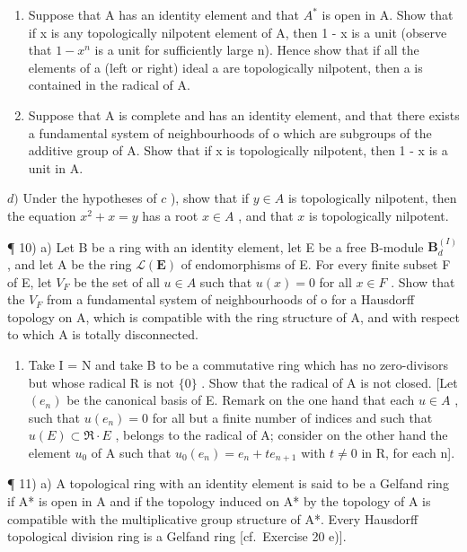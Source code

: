 \begin{enumerate}
\def\labelenumi{\alph{enumi})}
\setcounter{enumi}{1}
\item
  Suppose that A has an identity element and that \(A^{*}\) is open in A. Show that if x is any topologically nilpotent element of A, then 1 - x is a unit (observe that \(1 - x^{n}\) is a unit for sufficiently large n). Hence show that if all the elements of a (left or right) ideal a are topologically nilpotent, then a is contained in the radical of A.
\item
  Suppose that A is complete and has an identity element, and that there exists a fundamental system of neighbourhoods of o which are subgroups of the additive group of A. Show that if x is topologically nilpotent, then 1 - x is a unit in A.
\end{enumerate}

\(d)\) Under the hypotheses of \(c\) ), show that if \(y \in A\) is topologically nilpotent, then the equation \(x^{2} + x = y\) has a root \(x \in A\) , and that \(x\) is topologically nilpotent.

¶ 10) a) Let B be a ring with an identity element, let E be a free B-module \(\mathbf{B}_{d}^{(I)}\) , and let A be the ring \(\mathcal{L}(\mathbf{E})\) of endomorphisms of E. For every finite subset F of E, let \(V_{F}\) be the set of all \(u \in A\) such that \(u(x) = 0\) for all \(x \in F\) . Show that the \(V_{F}\) from a fundamental system of neighbourhoods of o for a Hausdorff topology on A, which is compatible with the ring structure of A, and with respect to which A is totally disconnected.

\begin{enumerate}
\def\labelenumi{\alph{enumi})}
\setcounter{enumi}{1}
\tightlist
\item
  Take I = N and take B to be a commutative ring which has no zero-divisors but whose radical R is not \(\{0\}\) . Show that the radical of A is not closed. {[}Let \((e_{n})\) be the canonical basis of E. Remark on the one hand that each \(u \in A\) , such that \(u(e_{n}) = 0\) for all but a finite number of indices and such that \(u(E) \subset \Re \cdot E\) , belongs to the radical of A; consider on the other hand the element \(u_{0}\) of A such that \(u_{0}(e_{n}) = e_{n} + te_{n+1}\) with \(t \neq 0\) in R, for each n{]}.
\end{enumerate}

¶ 11) a) A topological ring with an identity element is said to be a Gelfand ring if A* is open in A and if the topology induced on A* by the topology of A is compatible with the multiplicative group structure of A*. Every Hausdorff topological division ring is a Gelfand ring {[}cf.~Exercise 20 e){]}.


